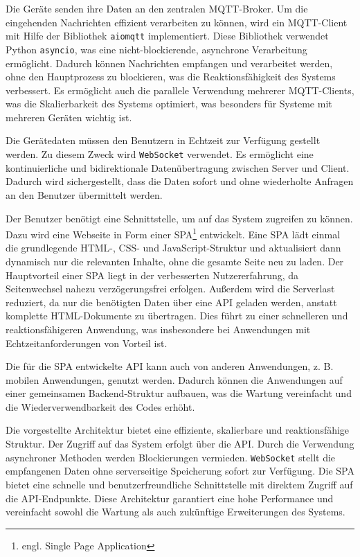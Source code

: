 \documentclass[12pt, letterpaper]{article}
\begin{document}
\par Die Geräte senden ihre Daten an den zentralen MQTT-Broker. Um die eingehenden Nachrichten effizient verarbeiten zu können, wird ein MQTT-Client mit Hilfe der Bibliothek \texttt{aiomqtt} implementiert. Diese Bibliothek verwendet Python \texttt{asyncio}, was eine nicht-blockierende, asynchrone Verarbeitung ermöglicht. Dadurch können Nachrichten empfangen und verarbeitet werden, ohne den Hauptprozess zu blockieren, was die Reaktionsfähigkeit des Systems verbessert. Es ermöglicht auch die parallele Verwendung mehrerer MQTT-Clients, was die Skalierbarkeit des Systems optimiert, was besonders für Systeme mit mehreren Geräten wichtig ist.
\par Die Gerätedaten müssen den Benutzern in Echtzeit zur Verfügung gestellt werden. Zu diesem Zweck wird \texttt{WebSocket} verwendet. Es ermöglicht eine kontinuierliche und bidirektionale Datenübertragung zwischen Server und Client. Dadurch wird sichergestellt, dass die Daten sofort und ohne wiederholte Anfragen an den Benutzer übermittelt werden.
\par Der Benutzer benötigt eine Schnittstelle, um auf das System zugreifen zu können. Dazu wird eine Webseite in Form einer SPA\footnote{engl. Single Page Application} entwickelt. Eine SPA lädt einmal die grundlegende HTML-, CSS- und JavaScript-Struktur und aktualisiert dann dynamisch nur die relevanten Inhalte, ohne die gesamte Seite neu zu laden. Der Hauptvorteil einer SPA liegt in der verbesserten Nutzererfahrung, da Seitenwechsel nahezu verzögerungsfrei erfolgen. Außerdem wird die Serverlast reduziert, da nur die benötigten Daten über eine API geladen werden, anstatt komplette HTML-Dokumente zu übertragen. Dies führt zu einer schnelleren und reaktionsfähigeren Anwendung, was insbesondere bei Anwendungen mit Echtzeitanforderungen von Vorteil ist. 
\par Die für die SPA entwickelte API kann auch von anderen Anwendungen, z. B. mobilen Anwendungen, genutzt werden. Dadurch können die Anwendungen auf einer gemeinsamen Backend-Struktur aufbauen, was die Wartung vereinfacht und die Wiederverwendbarkeit des Codes erhöht.
\par Die vorgestellte Architektur bietet eine effiziente, skalierbare und reaktionsfähige Struktur. Der Zugriff auf das System erfolgt über die API. Durch die Verwendung asynchroner Methoden werden Blockierungen vermieden. \texttt{WebSocket} stellt die empfangenen Daten ohne serverseitige Speicherung sofort zur Verfügung. Die SPA bietet eine schnelle und benutzerfreundliche Schnittstelle mit direktem Zugriff auf die API-Endpunkte. Diese Architektur garantiert eine hohe Performance und vereinfacht sowohl die Wartung als auch zukünftige Erweiterungen des Systems.
\newpage
\end{document}

